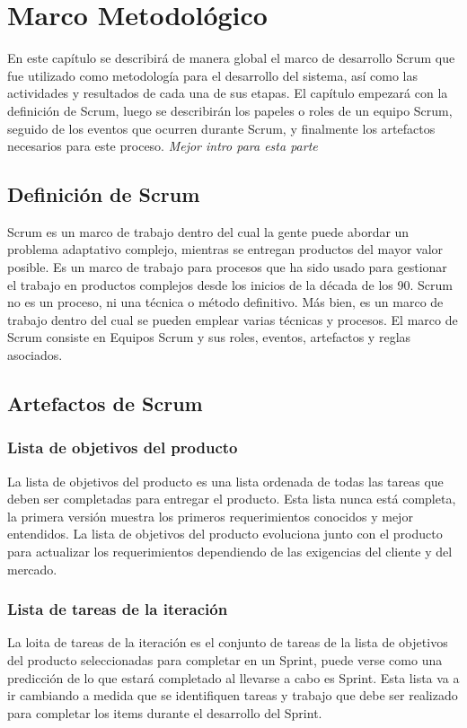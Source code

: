 \chapter{Marco Metodológico}

En este capítulo se describirá de manera global el marco de desarrollo Scrum que fue utilizado como metodología para el desarrollo del sistema, así como las actividades y resultados de cada una de sus etapas. El capítulo empezará con la definición de Scrum, luego se describirán los papeles o roles de un equipo Scrum, seguido de los eventos que ocurren durante Scrum, y finalmente los artefactos necesarios para este proceso. \textit{Mejor intro para esta parte}

\section{Definición de Scrum}
Scrum es un marco de trabajo dentro del cual la gente puede abordar un problema adaptativo complejo, mientras se entregan productos del mayor valor posible. Es un marco de trabajo para procesos que ha sido usado para gestionar el trabajo en productos complejos desde los inicios de la década de los 90. Scrum no es un proceso, ni una técnica o método definitivo. Más bien, es un marco de trabajo dentro del cual se pueden emplear varias técnicas y procesos. El marco de Scrum consiste en Equipos Scrum y sus roles, eventos, artefactos y reglas asociados. \cite{scrumSchwaber}

\section{Artefactos de Scrum}
\subsection{Lista de objetivos del producto}
La lista de objetivos del producto es una lista ordenada de todas las tareas que deben ser completadas para entregar el producto. Esta lista nunca está completa, la primera versión muestra los primeros requerimientos conocidos y mejor entendidos. \cite{scrumSchwaber} La lista de objetivos del producto evoluciona junto con el producto para actualizar los requerimientos dependiendo de las exigencias del cliente y del mercado.

\subsection{Lista de tareas de la iteración}
La loita de tareas de la iteración es el conjunto de tareas de la lista de objetivos del producto seleccionadas para completar en un Sprint, puede verse como una predicción de lo que estará completado al llevarse a cabo es Sprint. \cite{scrumSchwaber} Esta lista va a ir cambiando a medida que se identifiquen tareas y trabajo que debe ser realizado para completar los items durante el desarrollo del Sprint.

